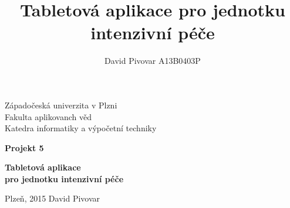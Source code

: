 \documentclass[12pt, a4paper]{report}
\title{Tabletová aplikace pro jednotku intenzivní péče}
\author{David Pivovar A13B0403P}
\begin{document}
\begin{titlepage}

\begin{center}
	
	{\fontsize{22}{} \selectfont
		Západočeská univerzita v Plzni\\
		Fakulta aplikovanch věd\\
		Katedra informatiky a výpočetní techniky\\
	}
	
	\vfill
	\vfill
	
	{\fontsize{28}{} \textbf{
		Projekt 5\\
	}}
	
	\vfill
	
	{\fontsize{36}{} \textbf{
		Tabletová aplikace\\pro jednotku intenzivní péče
	}}

\end{center}

\vfill
\vfill
\vfill
\vfill

\begin{flushleft}

	{\fontsize{16}{} \selectfont
		Plzeň, 2015
		\hfill
		David Pivovar
	}
	
\end{flushleft}

\end{titlepage}


\tableofcontents






%
%
%


\end{document}
